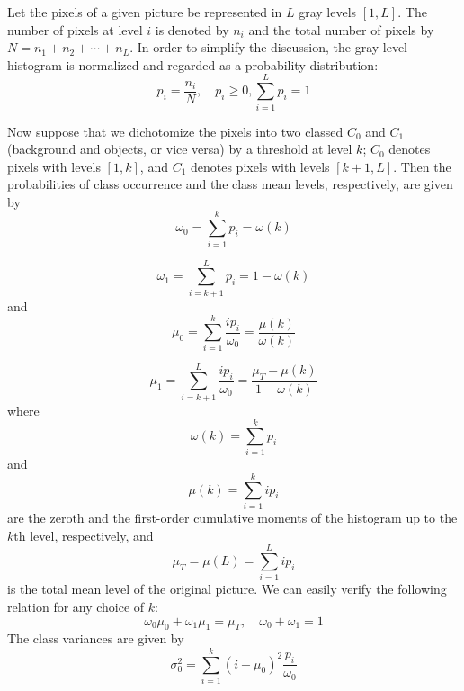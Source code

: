 Let the pixels of a given picture be represented in $L$ gray levels $[1,L]$.  The number of pixels at level $i$ is denoted by $n_i$ and the total number of pixels by $N=n_1+n_2+\cdots+n_L$. In order to simplify the discussion, the gray-level histogram is normalized and regarded as a probability distribution:
\begin{equation}
  \label{eq2:1}
  p_i=\frac{n_i}{N},\quad p_i\geqslant 0,\sum_{i=1}^Lp_i=1
\end{equation}

Now suppose that we dichotomize the pixels into two classed $C_0$ and $C_1$(background and objects, or vice versa) by a threshold at level $k$; $C_0$ denotes pixels with levels $[1,k]$, and $C_1$ denotes pixels with levels $[k+1,L]$. Then the probabilities of class occurrence and the class mean levels, respectively, are given by
\begin{equation}
  \label{eq2:2}
  \omega_0=\sum_{i=1}^kp_i=\omega(k)
\end{equation}

\begin{equation}
  \label{eq2:3}
  \omega_1=\sum_{i=k+1}^Lp_i=1-\omega(k)
\end{equation}
and
\begin{equation}
  \label{eq2:4}
  \mu_0=\sum_{i=1}^k\frac{ip_i}{\omega_0}=\frac{\mu(k)}{\omega(k)}
\end{equation}

\begin{equation}
  \label{eq2:5}
  \mu_1=\sum_{i=k+1}^L\frac{ip_i}{\omega_0}=\frac{\mu_T-\mu(k)}{1-\omega(k)}
\end{equation}
where
\begin{equation}
  \label{eq2:6}
  \omega(k)=\sum_{i=1}^kp_i
\end{equation}
and
\begin{equation}
  \label{eq2:7}
  \mu(k)=\sum_{i=1}^kip_i
\end{equation}
are the zeroth and the first-order cumulative moments of the histogram up to the $k$th level, respectively, and
\begin{equation}
  \label{eq2:8}
  \mu_T=\mu(L)=\sum_{i=1}^Lip_i
\end{equation}
is the total mean level of the original picture. We can easily verify the following relation for any choice of $k$:
\begin{equation}
  \label{eq2:9}
  \omega_0\mu_0+\omega_1\mu_1=\mu_T,\quad\omega_0+\omega_1=1
\end{equation}
The class variances are given by
\begin{equation}
  \label{eq2:10}
  \sigma_0^2=\sum_{i=1}^k(i-\mu_0)^2\frac{p_i}{\omega_0}
\end{equation}

